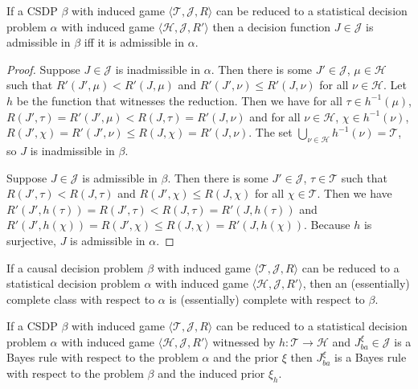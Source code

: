 \begin{lemma}\label{lem:red_adm_app}
If a CSDP $\beta$ with induced game $\langle \mathscr{T},\mathscr{J}, R\rangle$ can be reduced to a statistical decision problem $\alpha$ with induced game $\langle \mathscr{H},\mathscr{J},R' \rangle$ then a decision function $J\in \mathscr{J}$ is admissible in $\beta$ iff it is admissible in $\alpha$.
\end{lemma}

\begin{proof}
Suppose $J\in\mathscr{J}$ is inadmissible in $\alpha$. Then there is some $J'\in\mathscr{J}$, $\mu\in\mathscr{H}$ such that $R'(J',\mu)<R'(J,\mu)$ and $R'(J',\nu)\leq R'(J,\nu)$ for all $\nu\in \mathscr{H}$. Let $h$ be the function that witnesses the reduction. Then we have for all $\tau\in h^{-1}(\mu)$, $R(J',\tau)=R'(J',\mu)<R(J,\tau)=R'(J,\nu)$ and for all $\nu\in \mathscr{H}$, $\chi\in h^{-1}(\nu)$, $R(J',\chi)=R'(J',\nu)\leq R(J,\chi)=R'(J,\nu)$. The set $\bigcup_{\nu\in\mathscr{H}} h^{-1}(\nu)=\mathscr{T}$, so $J$ is inadmissible in $\beta$.

Suppose $J\in \mathscr{J}$ is admissible in $\beta$. Then there is some $J'\in\mathscr{J}$, $\tau\in\mathscr{T}$ such that $R(J',\tau)<R(J,\tau)$ and $R(J',\chi)\leq R(J,\chi)$ for all $\chi\in \mathscr{T}$. Then we have $R'(J',h(\tau))=R(J',\tau)<R(J,\tau)=R'(J,h(\tau))$ and $R'(J',h(\chi))=R(J',\chi)\leq R(J,\chi)=R'(J,h(\chi))$. Because $h$ is surjective, $J$ is admissible in $\alpha$.
\end{proof}

\begin{corollary}\label{cor:red_comp}
If a causal decision problem $\beta$ with induced game $\langle \mathscr{T},\mathscr{J}, R\rangle$ can be reduced to a statistical decision problem $\alpha$ with induced game $\langle \mathscr{H},\mathscr{J},R' \rangle$, then an (essentially) complete class with respect to $\alpha$ is (essentially) complete with respect to $\beta$.
\end{corollary}

\begin{lemma}\label{lem:IB_rule}
If a CSDP $\beta$ with induced game $\langle \mathscr{T},\mathscr{J}, R\rangle$ can be reduced to a statistical decision problem $\alpha$ with induced game $\langle \mathscr{H},\mathscr{J},R' \rangle$ witnessed by $h:\mathscr{T}\to\mathscr{H}$ and $J_{ba}^\xi\in \mathscr{J}$ is a Bayes rule with respect to the problem $\alpha$ and the prior $\xi$ then $J_{ba}^\xi$ is a Bayes rule with respect to the problem $\beta$ and the induced prior $\xi_h$.
\end{lemma}

